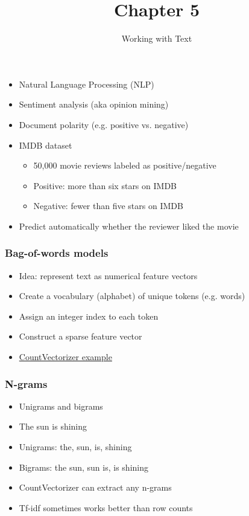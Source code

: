 \documentclass{beamer}
\title{Chapter 5}
\subtitle{Working with Text}
\begin{document}
\maketitle

\begin{frame}
  \frametitle{}
  \begin{itemize}
  \item Natural Language Processing (NLP)
  \item Sentiment analysis (aka opinion mining)
  \item Document polarity (e.g. positive vs. negative)
  \item IMDB dataset
    \begin{itemize}
    \item 50,000 movie reviews labeled as positive/negative
    \item Positive: more than six stars on IMDB
    \item Negative: fewer than five stars on IMDB
    \end{itemize}
  \item Predict automatically whether the reviewer liked the movie
  \end{itemize}
\end{frame}

\begin{frame}
  \frametitle{Bag-of-words models}
  \begin{itemize}
  \item Idea: represent text as numerical feature vectors
  \item Create a vocabulary (alphabet) of unique tokens (e.g. words)
  \item Assign an integer index to each token
  \item Construct a sparse feature vector
  \item \href{https://github.com/rasbt/python-machine-learning-book/blob/master/code/ch08/ch08.ipynb}{CountVectorizer example}
  \end{itemize}
\end{frame}

\begin{frame}
  \frametitle{N-grams}
  \begin{itemize}
  \item Unigrams and bigrams
  \item The sun is shining
  \item Unigrams: the, sun, is, shining
  \item Bigrams: the sun, sun is, is shining
  \item CountVectorizer can extract any n-grams
  \item Tf-idf sometimes works better than row counts
  \end{itemize}
\end{frame}
\end{document}
